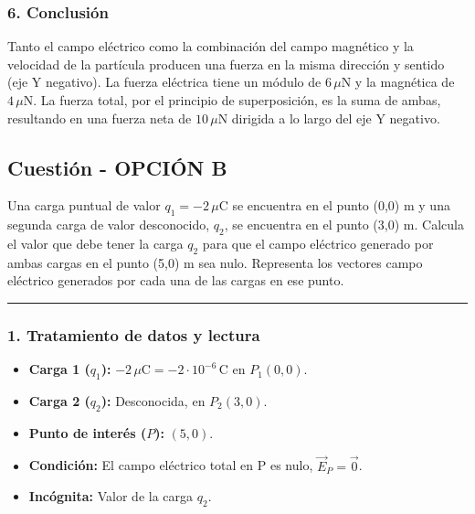 \subsubsection*{6. Conclusión}
\begin{cajaconclusion}
Tanto el campo eléctrico como la combinación del campo magnético y la velocidad de la partícula producen una fuerza en la misma dirección y sentido (eje Y negativo). La fuerza eléctrica tiene un módulo de $6\,\mu\text{N}$ y la magnética de $4\,\mu\text{N}$. La fuerza total, por el principio de superposición, es la suma de ambas, resultando en una fuerza neta de $10\,\mu\text{N}$ dirigida a lo largo del eje Y negativo.
\end{cajaconclusion}

\newpage
\subsection{Cuestión - OPCIÓN B}
\label{subsec:IVB_2012_sep}

\begin{cajaenunciado}
Una carga puntual de valor $q_1=-2\,\mu\text{C}$ se encuentra en el punto (0,0) m y una segunda carga de valor desconocido, $q_2$, se encuentra en el punto (3,0) m. Calcula el valor que debe tener la carga $q_2$ para que el campo eléctrico generado por ambas cargas en el punto (5,0) m sea nulo. Representa los vectores campo eléctrico generados por cada una de las cargas en ese punto.
\end{cajaenunciado}
\hrule

\subsubsection*{1. Tratamiento de datos y lectura}
\begin{itemize}
    \item \textbf{Carga 1 ($q_1$):} $-2\,\mu\text{C} = -2 \cdot 10^{-6}\,\text{C}$ en $P_1(0,0)$.
    \item \textbf{Carga 2 ($q_2$):} Desconocida, en $P_2(3,0)$.
    \item \textbf{Punto de interés ($P$):} $(5,0)$.
    \item \textbf{Condición:} El campo eléctrico total en P es nulo, $\vec{E}_P = \vec{0}$.
    \item \textbf{Incógnita:} Valor de la carga $q_2$.
\end{itemize}

